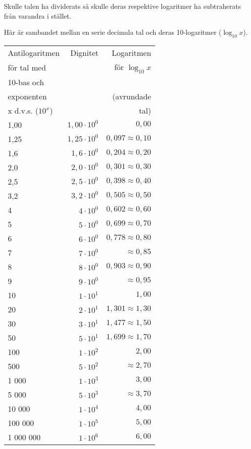 Skulle talen ha dividerats så skulle deras respektive logaritmer ha subtraherats
från varandra i stället.

Här är sambandet mellan en serie decimala tal och deras 10-logaritmer
(\(\log_{10} x\)).

\begin{tabular}{l|r|r}
Antilogaritmen    & Dignitet & Logaritmen            \\
för tal med       &          & för \(\log_{10} x\)        \\
10-bas och        &          &                       \\
exponenten        &          & (avrundade            \\
x d.v.s. (\(10^x\)) &          & tal)                  \\ \hline
1,00      & \(1,00 \cdot 10^0\) & \(0,00\)               \\
1,25      & \(1,25 \cdot 10^0\) & \(0,097 \approx 0,10\) \\
1,6       & \(1,6 \cdot 10^0\) & \(0,204 \approx 0,20\)  \\
2,0       & \(2,0 \cdot 10^0\) & \(0,301 \approx 0,30\)  \\
2,5       & \(2,5 \cdot 10^0\) & \(0,398 \approx 0,40\)  \\
3,2       & \(3,2 \cdot 10^0\) & \(0,505 \approx 0,50\)  \\
4         & \(4 \cdot 10^0\)   & \(0,602 \approx 0,60\)  \\
5         & \(5 \cdot 10^0\)   & \(0,699 \approx 0,70\)  \\
6         & \(6 \cdot 10^0\)   & \(0,778 \approx 0,80\)  \\
7         & \(7 \cdot 10^0\)   & \(\approx 0,85\)        \\
8         & \(8 \cdot 10^0\)   & \(0,903 \approx 0,90\)  \\
9         & \(9 \cdot 10^0\)   & \(\approx 0,95\)        \\
10        & \(1 \cdot 10^1\)   & \(1,00\)                \\
20        & \(2 \cdot 10^1\)   & \(1,301 \approx 1,30\)  \\
30        & \(3 \cdot 10^1\)   & \(1,477 \approx 1,50\)  \\
50        & \(5 \cdot 10^1\)   & \(1,699 \approx 1,70\)  \\
100       & \(1 \cdot 10^2\)   & \(2,00\)                \\
500       & \(5 \cdot 10^2\)   & \(\approx 2,70\)        \\
1 000     & \(1 \cdot 10^3\)   & \(3,00\)                \\
5 000     & \(5 \cdot 10^3\)   & \(\approx 3,70\)         \\
10 000    & \(1 \cdot 10^4\)   & \(4,00\)                \\
100 000   & \(1 \cdot 10^5\)   & \(5,00\)                \\
1 000 000 & \(1 \cdot 10^6\)   & \(6,00\)                \\
\end{tabular}

